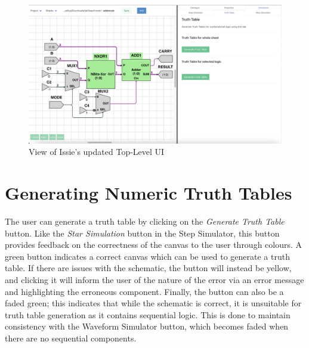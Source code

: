 \begin{figure}[h]
    \centering
    \includegraphics[width=\textwidth]{04.AnalysisDesign/Issieview.png}
    \caption{View of Issie's updated Top-Level UI}
    \label{fig:issieview}
\end{figure}

\section{Generating Numeric Truth Tables} \label{sec:analysis_ttGen}
The user can generate a truth table by clicking on the \textit{Generate Truth Table} button. Like the  \textit{Star Simulation} button in the Step Simulator, this button provides feedback on the correctness of the canvas to the user through colours. A green button indicates a correct canvas which can be used to generate a truth table. If there are issues with the schematic, the button will instead be yellow, and clicking it will inform the user of the nature of the error via an error message and highlighting the erroneous component. Finally, the button can also be a faded green; this indicates that while the schematic is correct, it is unsuitable for truth table generation as it contains sequential logic. This is done to maintain consistency with the Waveform Simulator button, which becomes faded when there are no sequential components.

